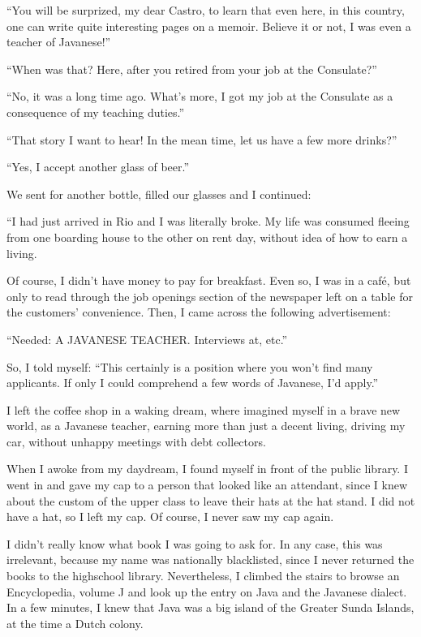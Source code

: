 \documentclass[a4paper,12pt]{book}
\begin{document}
``You will be surprized, my dear Castro,
to learn that even here, in this country,
one can write quite interesting pages on a
memoir. Believe it or not,
I was even a teacher of Javanese!''

``When was that? Here, after you retired
from your job at the Consulate?''


``No, it was a long time ago.
What's more, I got my job at the
Consulate as a consequence of my
teaching duties.''

``That story I want to hear! In the mean time,
let us have a few more drinks?''

``Yes, I accept another glass of beer.''

We sent for another bottle, filled our glasses
and I continued:

``I had just arrived in Rio and I was literally broke.
My life was consumed fleeing
from one boarding house to
the other on rent day, without
idea of how to earn a living.

Of course, I didn't have money
to pay for breakfast.
Even so, I was in a café, but only to
read through the job openings section
of the newspaper left on a table
for the customers' convenience. Then, I came across
the following advertisement:


``Needed: A JAVANESE TEACHER.  Interviews at, etc.''

So, I told myself: ``This certainly is a position
where you won't find many applicants. If only I
could comprehend a few words of Javanese,
I'd apply.''

I left the coffee shop in a waking dream,
where imagined myself in a brave new world,
as a Javanese teacher,
earning more than just a decent living,
driving my car,
without unhappy meetings with debt collectors.

When I awoke from my daydream,
I found myself in front of the public library.
I went in and gave my cap to a
person that looked like an attendant,
since I knew about the custom of the
upper class to leave their hats at
the hat stand. I did not have
a hat, so I left my cap. Of course,
I never saw my cap again.

I didn't really know what
book I was going to ask for.
In any case, this was irrelevant,
because my name was nationally blacklisted,
since I never returned the books to
the highschool library. Nevertheless,
I climbed the stairs to browse
an Encyclopedia,
volume J and look up the entry on
Java and the Javanese dialect. 
In a few minutes, I knew that Java was a
big island of the Greater Sunda Islands,
at the time a Dutch colony.
\end{document}
